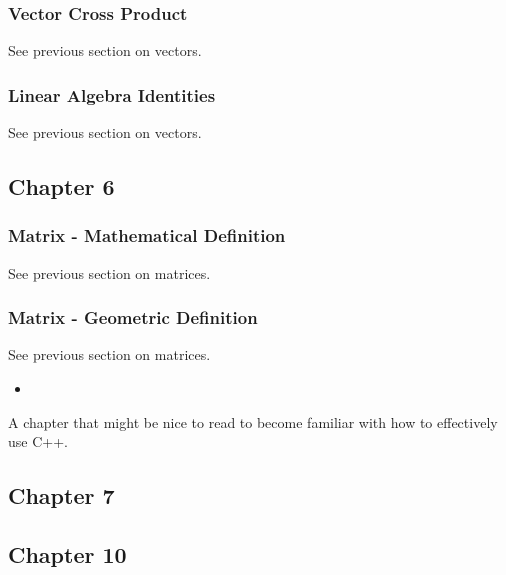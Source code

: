 \documentclass[a4paper,11pt]{amsart}
\begin{document}
\subsubsection{Vector Cross Product}
See previous section on vectors.
\subsubsection{Linear Algebra Identities}
See previous section on vectors.

\subsection{Chapter 6}

\subsubsection{Matrix - Mathematical Definition}
See previous section on matrices.
\subsubsection{Matrix - Geometric Definition}
See previous section on matrices.
\begin{itemize}
    \item 
\end{itemize}

A chapter that might be nice to read to become familiar with how to effectively
use C++.

\subsection{Chapter 7}


\subsection{Chapter 10}
\end{document}
